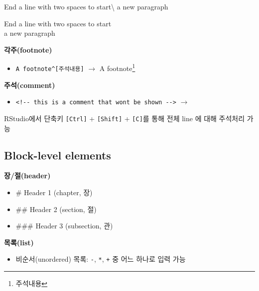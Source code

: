 \documentclass[
  11pt,
]{krantz}
\makeatletter
\newenvironment{Shaded}{\begin{snugshade}}{\end{snugshade}}
\newcommand{\NormalTok}[1]{#1}
\providecommand{\tightlist}{%
  \setlength{\itemsep}{0pt}\setlength{\parskip}{0pt}}
\newenvironment{kframe}{%
\medskip{}
\setlength{\fboxsep}{.8em}
 \def\at@end@of@kframe{}%
 \ifinner\ifhmode%
  \def\at@end@of@kframe{\end{minipage}}%
  \begin{minipage}{\columnwidth}%
 \fi\fi%
 \def\FrameCommand##1{\hskip\@totalleftmargin \hskip-\fboxsep
 \colorbox{shadecolor}{##1}\hskip-\fboxsep
     \hskip-\linewidth \hskip-\@totalleftmargin \hskip\columnwidth}%
 \MakeFramed {\advance\hsize-\width
   \@totalleftmargin\z@ \linewidth\hsize
   \@setminipage}}%
 {\par\unskip\endMakeFramed%
 \at@end@of@kframe}
\newenvironment{rmdblock}[1]
  {
  \begin{itemize}
  \renewcommand{\labelitemi}{
    \raisebox{-.7\height}[0pt][0pt]{
      {\setkeys{Gin}{width=3em,keepaspectratio}\texttt{[image: images/\#1]}}
    }
  }
  \setlength{\fboxsep}{1em}
  \begin{kframe}
  \item
  }
  {
  \end{kframe}
  \end{itemize}
  }
\newenvironment{rmdtip}
  {\begin{rmdblock}{tip}}
  {\end{rmdblock}}
\makeatother
\begin{document}
\begin{Shaded}
\begin{Highlighting}[]
\NormalTok{End a line with two spaces to start\textbackslash{}}
\NormalTok{a new paragraph}
\end{Highlighting}
\end{Shaded}

End a line with two spaces to start\\
a new paragraph

\textbf{각주(footnote)}

\begin{itemize}
\tightlist
\item
  \texttt{A\ footnote\^{}{[}주석내용{]}} \(\rightarrow\) A footnote\footnote{주석내용}
\end{itemize}

\textbf{주석(comment)}

\begin{itemize}
\tightlist
\item
  \texttt{\textless{}!-\/-\ this\ is\ a\ comment\ that\ won\textquotesingle{}t\ be\ shown\ -\/-\textgreater{}} \(\rightarrow\)
\end{itemize}

\footnotesize

\begin{rmdtip}
RStudio에서 단축키 \texttt{{[}Ctrl{]}} + \texttt{{[}Shift{]}} + \texttt{{[}C{]}}를 통해 전체 line 에 대해 주석처리 가능
\end{rmdtip}

\normalsize

\hypertarget{block-level-elements}{%
\subsection{Block-level elements}\label{block-level-elements}}

\textbf{장/절(header)}

\begin{itemize}
\tightlist
\item
  \# Header 1 (chapter, 장)
\item
  \#\# Header 2 (section, 절)
\item
  \#\#\# Header 3 (subsection, 관)
\end{itemize}

\textbf{목록(list)}

\begin{itemize}
\tightlist
\item
  비순서(unordered) 목록: \texttt{-}, \texttt{*}, \texttt{+} 중 어느 하나로 입력 가능
\end{itemize}
\end{document}
